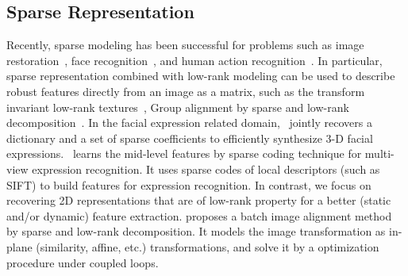 \documentclass[journal]{IEEEtran}
\begin{document}
\subsection{Sparse Representation}

Recently, sparse modeling has been successful for problems such as image restoration~\cite{Yang_CVPR08}, face recognition~\cite{Wright_PAMI09}, and human action recognition~\cite{Qiu_ICCV11}. In particular, sparse representation combined with low-rank modeling can be used to describe robust features directly from an image as a matrix, such as the transform invariant low-rank textures~\cite{Zhang_IJCV12}, Group alignment by sparse and low-rank decomposition~\cite{Peng_PAMI12}. In the facial expression related domain,~\cite{Lin12} jointly recovers a dictionary and a set of sparse coefficients to efficiently synthesize 3-D facial expressions.~\cite{Tariq12} learns the mid-level features by sparse coding technique for multi-view expression recognition. It uses sparse codes of local descriptors (such as SIFT) to build features for expression recognition. In contrast, we focus on recovering 2D representations that are of low-rank property for a better (static and/or dynamic) feature extraction. \cite{Peng_CVPR10} proposes a batch image alignment method by sparse and low-rank decomposition. It models the image transformation as in-plane (similarity, affine, etc.) transformations, and solve it by a optimization procedure under coupled loops. 
\end{document}
